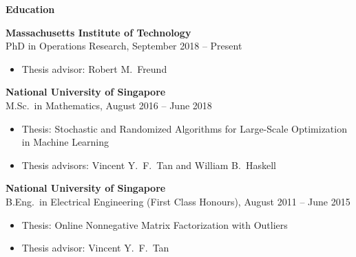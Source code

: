 \documentclass[11pt]{article}
\begin{document}
\begin{minipage}[t]{0.18\textwidth}
\textbf{Education}
\end{minipage}
\begin{minipage}[t]{0.8\textwidth}
{\bf Massachusetts Institute of Technology}\\
{PhD in Operations Research}, September 2018 -- Present\vspace{-.2cm}
\begin{itemize}
\item { Thesis advisor}: {Robert M.\ Freund}
\end{itemize}
{\bf National University of Singapore}\\
{M.Sc.\ in Mathematics}, August 2016 -- June 2018 \vspace{-0.2cm}
\begin{itemize}
\item { Thesis}: {Stochastic and Randomized Algorithms for Large-Scale  Optimization in Machine Learning}\vspace{-0.2cm}
\item { Thesis advisors}: {Vincent Y.\ F.\ Tan and William B.\ Haskell}
\end{itemize}
{\bf National University of Singapore}\\
{B.Eng.\ in Electrical Engineering} (First Class Honours),  August 2011 -- June 2015 \vspace{-0.2cm}
\begin{itemize}
\item { Thesis}: {Online Nonnegative Matrix Factorization with Outliers}\vspace{-0.2cm}
\item { Thesis advisor}: {Vincent Y.\ F.\ Tan}
\end{itemize}

\end{minipage} \newline\newline
\end{document}
